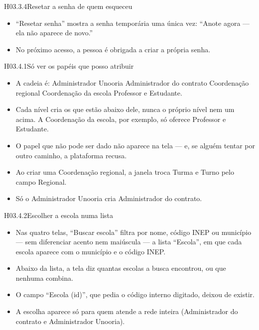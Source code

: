 \begin{historia}{H03.3.4}{Resetar a senha de quem esqueceu}{\pronto}
\aceite
\begin{itemize}
  \item \enquote{Resetar senha} mostra a senha temporária uma única vez:
    \enquote{Anote agora --- ela não aparece de novo.}
  \item No próximo acesso, a pessoa é obrigada a criar a própria senha.
\end{itemize}
\end{historia}


\begin{historia}{H03.4.1}{Só ver os papéis que posso atribuir}{\pronto}
\aceite
\begin{itemize}
  \item A cadeia é: Administrador Unooria \seta{} Administrador do contrato
    \seta{} Coordenação regional \seta{} Coordenação da escola \seta{}
    Professor e Estudante.
  \item Cada nível cria os que estão abaixo dele, nunca o próprio nível nem um
    acima. A Coordenação da escola, por exemplo, só oferece Professor e
    Estudante.
  \item O papel que não pode ser dado não aparece na tela --- e, se alguém
    tentar por outro caminho, a plataforma recusa.
  \item Ao criar uma Coordenação regional, a janela troca Turma e Turno pelo
    campo Regional.
  \item Só o Administrador Unooria cria Administrador do contrato.
\end{itemize}
\end{historia}

\begin{historia}{H03.4.2}{Escolher a escola numa lista}{\pronto}
\aceite
\begin{itemize}
  \item Nas quatro telas, \enquote{Buscar escola} filtra por nome, código INEP
    ou município --- sem diferenciar acento nem maiúscula --- a lista
    \enquote{Escola}, em que cada escola aparece com o município e o código
    INEP.
  \item Abaixo da lista, a tela diz quantas escolas a busca encontrou, ou que
    nenhuma combina.
  \item O campo \enquote{Escola (id)}, que pedia o código interno digitado,
    deixou de existir.
  \item A escolha aparece só para quem atende a rede inteira (Administrador do
    contrato e Administrador Unooria).
\end{itemize}
\end{historia}

